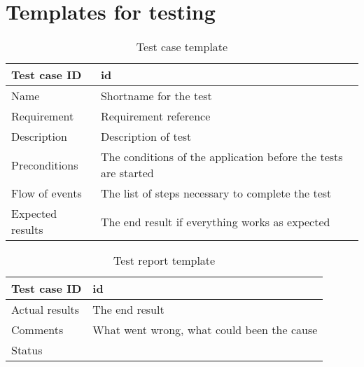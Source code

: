 \section{Templates for testing}
\begin{table}
\begin{tabular}{l|p{10cm}}
Test case ID & id \\ \hline
Name & Shortname for the test\\ \hline
Requirement & Requirement reference\\ \hline
Description & Description of test\\ \hline
Preconditions & The conditions of the application before the tests are started\\ \hline
Flow of events & The list of steps necessary to complete the test \\ \hline
Expected results & The end result if everything works as expected\\ \hline \hline
\end{tabular}
\caption{Test case template} \label{tab:casetemp}
\end{table}
\begin{table}
	\begin{tabular}{l|p{10cm}}
		Test case ID & id \\ \hline
		Actual results & The end result\\ \hline
		Comments & What went wrong, what could been the cause\\ \hline
		Status & 
	\end{tabular}
	\caption{Test report template} \label{tab:casereporttemp}
\end{table}